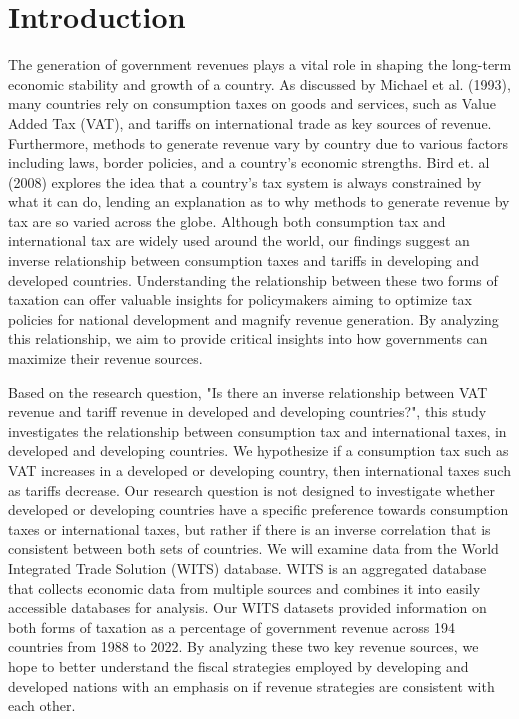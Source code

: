 \documentclass[12pt]{article}
\begin{document}
\section{Introduction} \label{sec:introduction}
The generation of government revenues plays a vital role in shaping the long-term economic stability and growth of a country. As discussed by Michael et al. (1993), many countries rely on consumption taxes on goods and services, such as Value Added Tax (VAT), and tariffs on international trade as key sources of revenue. Furthermore, methods to generate revenue vary by country due to various factors including laws, border policies, and a country's economic strengths. Bird et. al (2008) explores the idea that a country's tax system is always constrained by what it can do, lending an explanation as to why methods to generate revenue by tax are so varied across the globe. Although both consumption tax and international tax are widely used around the world, our findings suggest an inverse relationship between consumption taxes and tariffs in developing and developed countries. Understanding the relationship between these two forms of taxation can offer valuable insights for policymakers aiming to optimize tax policies for national development and magnify revenue generation. By analyzing this relationship, we aim to provide critical insights into how governments can maximize their revenue sources. 

Based on the research question, "Is there an inverse relationship between VAT revenue and tariff revenue in developed and developing countries?", this study investigates the relationship between consumption tax and international taxes, in developed and developing countries. We hypothesize if a consumption tax such as VAT increases in a developed or developing country, then international taxes such as tariffs decrease. Our research question is not designed to investigate whether developed or developing countries have a specific preference towards consumption taxes or international taxes, but rather if there is an inverse correlation that is consistent between both sets of countries. We will examine data from the World Integrated Trade Solution (WITS) database. WITS is an aggregated database that collects economic data from multiple sources and combines it into easily accessible databases for analysis. Our WITS datasets provided information on both forms of taxation as a percentage of government revenue across 194 countries from 1988 to 2022. By analyzing these two key revenue sources, we hope to better understand the fiscal strategies employed by developing and developed nations with an emphasis on if revenue strategies are consistent with each other. 
\end{document}
